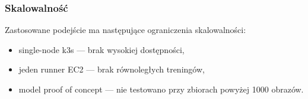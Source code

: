 \subsubsection{Skalowalność}

Zastosowane podejście ma następujące ograniczenia skalowalności:
\begin{itemize}
  \item single-node k3s --- brak wysokiej dostępności,
  \item jeden runner EC2 --- brak równoległych treningów,
  \item model proof of concept --- nie testowano przy zbiorach powyżej 1000 obrazów.
\end{itemize}
